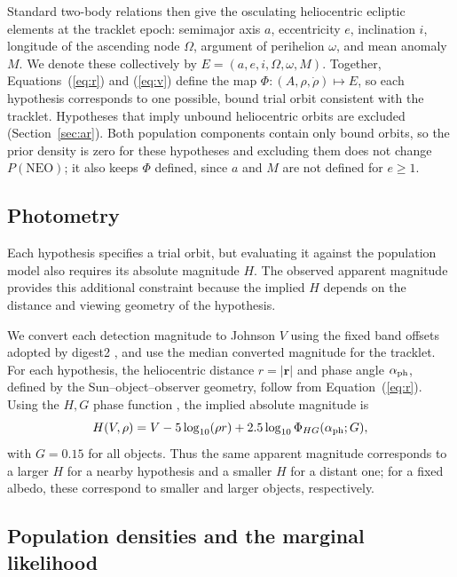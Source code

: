\documentclass[linenumbers,twocolumn]{aastex701}
\begin{document}
Standard two-body relations then give the osculating heliocentric ecliptic elements at the tracklet epoch: semimajor axis $a$, eccentricity $e$,
inclination $i$, longitude of the ascending node $\Omega$, argument of
perihelion $\omega$, and mean anomaly $M$. We denote these collectively by
$E=(a,e,i,\Omega,\omega,M)$. Together, Equations~(\ref{eq:r}) and
(\ref{eq:v}) define the map
$\Phi:(A,\rho,\dot\rho)\mapsto E$, so each hypothesis corresponds to one possible, bound
trial orbit consistent with the tracklet. Hypotheses that imply unbound heliocentric orbits are excluded
(Section~\ref{sec:ar}). Both population components contain only bound
orbits, so the prior density is zero for these hypotheses and excluding them does
not change $P(\mathrm{NEO})$; it also keeps $\Phi$ defined, since $a$ and
$M$ are not defined for $e\geq1$.

\subsection{Photometry}
\label{sec:photometry}

Each hypothesis specifies a trial orbit, but evaluating it
against the population model also requires its absolute magnitude $H$. The
observed apparent magnitude provides this additional constraint because the
implied $H$ depends on the distance and viewing geometry of the hypothesis.

We convert each detection magnitude to Johnson $V$ using the fixed band
offsets adopted by digest2 \citep{keys2019}, and use the median converted
magnitude for the tracklet. For each hypothesis, the heliocentric distance
$r=|\mathbf{r}|$ and phase angle $\alpha_{\rm ph}$, defined by the
Sun--object--observer geometry, follow from Equation~(\ref{eq:r}). Using the
$H,G$ phase function \citep{1989aste.conf..524B}, the implied absolute magnitude is
\begin{equation}
H(V,\rho) = V - 5\log_{10}(\rho r) + 2.5\log_{10}\Phi_{HG}(\alpha_{\rm ph};G),
\label{eq:H}
\end{equation}
with $G=0.15$ for all objects. Thus the same apparent magnitude corresponds
to a larger $H$ for a nearby hypothesis and a smaller $H$ for a distant one; for a
fixed albedo, these correspond to smaller and larger objects, respectively.

\subsection{Population densities and the marginal likelihood}
\label{sec:likelihood}
\end{document}
